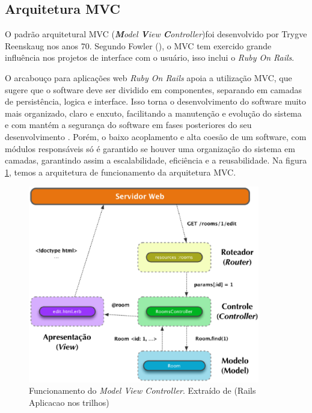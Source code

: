 \subsection{Arquitetura MVC}
\label{sub:arquiteturamvc}

O padrão arquitetural MVC (\textit{\textbf{M}odel \textbf{V}iew \textbf{C}ontroller})foi desenvolvido por Trygve Reenskaug nos anos 70. Segundo Fowler (\citeyear{fowler2006padroes}), o MVC tem exercido grande influência nos projetos de interface com o usuário, isso inclui o \textit{Ruby On Rails}.

O arcabouço para aplicações web \textit{Ruby On Rails} apoia a utilização  MVC, que sugere que o software deve ser dividido em componentes, separando em camadas de persistência, logica e interface. Isso torna o desenvolvimento do software muito mais organizado, claro e enxuto, facilitando a manutenção e evolução do sistema e com mantém a segurança do software em fases posteriores do seu desenvolvimento \cite{silva2012mvc}. Porém, o baixo acoplamento e alta coesão de um software, com módulos responsáveis só é garantido se houver uma organização do sistema em camadas, garantindo assim a escalabilidade, eficiência e a reusabilidade. Na figura \ref{fig:figuramvc}, temos a arquitetura de funcionamento da arquitetura MVC.

\graphicspath{{figuras/}}
\begin{figure}[H]
\centering
\includegraphics[width=0.9\textwidth]{funcionamentomvc}
\caption[Funcionamento do \textit{Model View Controller}]{Funcionamento do \textit{Model View Controller}. Extraído de (Rails Aplicacao nos trilhos)}
\label{fig:figuramvc}
\end{figure}

